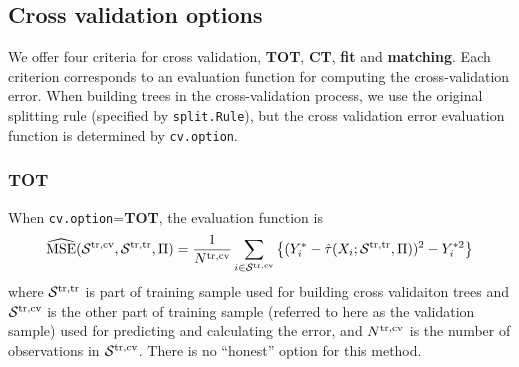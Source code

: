 \documentclass[11pt]{article}
\newcommand{\calp}{{\Pi}}
\newcommand{\cals}{{\cal S}}
\newcommand{\mse}{{\rm MSE}}
\newcommand{\train}{{\rm tr}}
\newcommand{\tcv}{{\rm cv}}
\begin{document}
\subsection{Cross validation options}
We offer four criteria for cross validation, \textbf{TOT}, \textbf{CT}, \textbf{fit} and \textbf{matching}. Each criterion corresponds to an evaluation function for computing the cross-validation error. When building trees in the cross-validation process, we use the original splitting rule (specified by \texttt{split.Rule}), but the cross validation error evaluation function is determined by \texttt{cv.option}.
\subsubsection{TOT}
When \texttt{cv.option}=\textbf{TOT}, the evaluation function is
\[\widehat{\mse}(\cals^{\train, \tcv}, \cals^{\train, \train}, \Pi) = \frac{1}{N^{\train, \tcv}}\sum_{i\in\cals^{\train, \tcv}}\left\{(Y^*_i - \hat{\tau}(X_i; \cals^{\train, \train}, \calp))^2  - Y^{*2}_i\right\}
\]
where $\cals^{\train, \train}$ is part of training sample used for building cross validaiton trees and $\cals^{\train, \tcv}$ is the other part of training sample (referred to here as the validation sample) used for predicting and calculating the error, and $N^{\train, \tcv}$ is the number of observations in $\cals^{\train, \tcv}$.  There is no ``honest'' option for this method.
\end{document}
